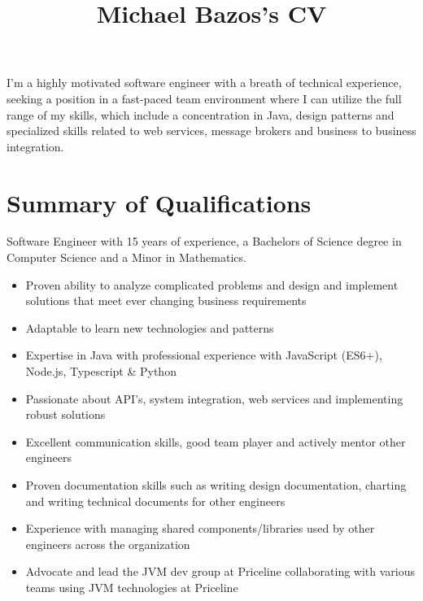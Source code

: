 \documentclass[a4paper,online]{adcv}
\title{Michael Bazos’s CV}
\begin{document}
I’m a highly motivated software engineer with a breath of technical experience, seeking a position in a fast-paced team environment where I can utilize the full range of my skills, which include a concentration in Java, design patterns and specialized skills related to web services, message brokers and business to business integration.

\section{Summary of Qualifications}

\begin{adcvtabletwo}
Software Engineer with 15 years of experience, a Bachelors of Science degree in Computer Science and a Minor in Mathematics.
  \begin{itemize}
    \item Proven ability to analyze complicated problems and design and implement solutions that meet ever changing business requirements
    \item Adaptable to learn new technologies and patterns
    \item Expertise in Java with professional experience with JavaScript (ES6+), Node.js, Typescript \& Python
    \item Passionate about API's, system integration, web services and implementing robust solutions
    \item Excellent communication skills, good team player and actively mentor other engineers
    \item Proven documentation skills such as writing design documentation, charting and writing technical documents for other engineers
    \item Experience with managing shared components/libraries used by other engineers across the organization
    \item Advocate and lead the JVM dev group at Priceline collaborating with various teams using JVM technologies at Priceline
  \end{itemize}
\end{adcvtabletwo}
\end{document}
